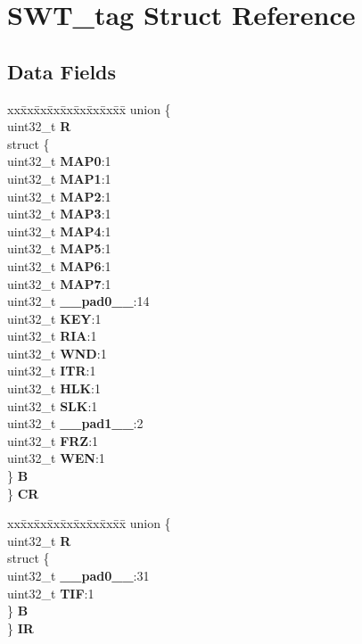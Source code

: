 \hypertarget{structSWT__tag}{}\section{S\+W\+T\+\_\+tag Struct Reference}
\label{structSWT__tag}
\subsection*{Data Fields}
\begin{DoxyCompactItemize}
\item 
\mbox{\label{structSWT__tag_af001638185e37f21417b5f53382174e2}} 
\begin{tabbing}
xx\=xx\=xx\=xx\=xx\=xx\=xx\=xx\=xx\=\kill
union \{\\
\>uint32\_t {\bfseries R}\\
\>struct \{\\
\>\>uint32\_t {\bfseries MAP0}:1\\
\>\>uint32\_t {\bfseries MAP1}:1\\
\>\>uint32\_t {\bfseries MAP2}:1\\
\>\>uint32\_t {\bfseries MAP3}:1\\
\>\>uint32\_t {\bfseries MAP4}:1\\
\>\>uint32\_t {\bfseries MAP5}:1\\
\>\>uint32\_t {\bfseries MAP6}:1\\
\>\>uint32\_t {\bfseries MAP7}:1\\
\>\>uint32\_t {\bfseries \_\_pad0\_\_}:14\\
\>\>uint32\_t {\bfseries KEY}:1\\
\>\>uint32\_t {\bfseries RIA}:1\\
\>\>uint32\_t {\bfseries WND}:1\\
\>\>uint32\_t {\bfseries ITR}:1\\
\>\>uint32\_t {\bfseries HLK}:1\\
\>\>uint32\_t {\bfseries SLK}:1\\
\>\>uint32\_t {\bfseries \_\_pad1\_\_}:2\\
\>\>uint32\_t {\bfseries FRZ}:1\\
\>\>uint32\_t {\bfseries WEN}:1\\
\>\} {\bfseries B}\\
\} {\bfseries CR}\\

\end{tabbing}\item 
\mbox{\label{structSWT__tag_a8a351d08c86188783b22416eb7092166}} 
\begin{tabbing}
xx\=xx\=xx\=xx\=xx\=xx\=xx\=xx\=xx\=\kill
union \{\\
\>uint32\_t {\bfseries R}\\
\>struct \{\\
\>\>uint32\_t {\bfseries \_\_pad0\_\_}:31\\
\>\>uint32\_t {\bfseries TIF}:1\\
\>\} {\bfseries B}\\
\} {\bfseries IR}\\


\end{tabbing}
\end{DoxyCompactItemize}
